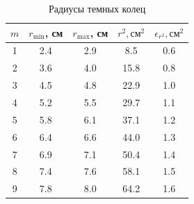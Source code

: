 \begin{table}[h]
\centering
\begin{tabular}{|c|c|c|c|c|}
\hline
\textbf{$m$} & \textbf{$r_\text{min}$, см} & \textbf{$r_\text{max}$, см} & \textbf{$r^2, \text{см}^2$} & \textbf{$\epsilon_{r^2}, \text{см}^2$} \\ \hline
1            & 2.4                         & 2.9                         & 8.5                         & 0.6                                    \\ \hline
2            & 3.6                         & 4.0                         & 15.8                        & 0.8                                    \\ \hline
3            & 4.5                         & 4.8                         & 22.9                        & 1.0                                    \\ \hline
4            & 5.2                         & 5.5                         & 29.7                        & 1.1                                    \\ \hline
5            & 5.8                         & 6.1                         & 37.1                        & 1.2                                    \\ \hline
6            & 6.4                         & 6.6                         & 44.0                        & 1.3                                    \\ \hline
7            & 6.9                         & 7.1                         & 50.4                        & 1.4                                    \\ \hline
8            & 7.4                         & 7.6                         & 58.1                        & 1.5                                    \\ \hline
9            & 7.8                         & 8.0                         & 64.2                        & 1.6                                    \\ \hline
\end{tabular}
\caption{Радиусы темных колец}
\label{tab:radius}
\end{table}